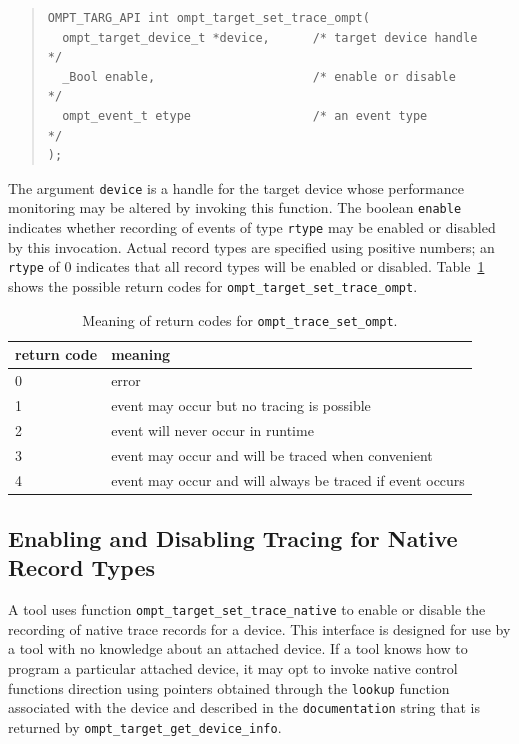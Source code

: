 \documentclass{article}
\begin{document}
\begin{quote}
\begin{verbatim}
OMPT_TARG_API int ompt_target_set_trace_ompt(
  ompt_target_device_t *device,      /* target device handle      */
  _Bool enable,                      /* enable or disable         */
  ompt_event_t etype                 /* an event type             */
);
\end{verbatim}
\end{quote}
The argument \verb|device| is a handle for the target device whose performance monitoring may be altered by invoking this function. 
The boolean \verb|enable| indicates whether recording of events of type \verb|rtype| may be enabled or disabled by this invocation.
Actual record types are specified using positive numbers; an \verb|rtype| of 0 indicates that all record types will be enabled or disabled.
Table~\ref{table:record_set} shows the possible return codes for \verb|ompt_target_set_trace_ompt|.
\begin{table}
\centering
\begin{tabular}{|l|l|}
\hline
return code & meaning \\\hline
0 & error\\\hline
1 & event may occur but no tracing is possible\\\hline
2 & event will never occur in runtime\\\hline
3 & event may occur and will be traced  when convenient\\\hline
4 & event may occur and will always be traced if event occurs\\\hline
\end{tabular}
\caption{Meaning of return codes for {\tt ompt\_trace\_set\_ompt}.}
\label{table:record_set}
\end{table}




\subsection{Enabling and Disabling Tracing for Native Record Types}
\label{sec:trace-event-native}
A tool uses function \verb|ompt_target_set_trace_native| to enable or disable the recording of native trace records for a device. This interface is designed for use by a tool with no 
knowledge about an attached device. If a tool knows how to program a particular attached device, it may opt to invoke native control functions direction using pointers obtained through the \verb|lookup| function associated with the device and described in the \verb|documentation| string that is returned by \verb|ompt_target_get_device_info|.
\end{document}
